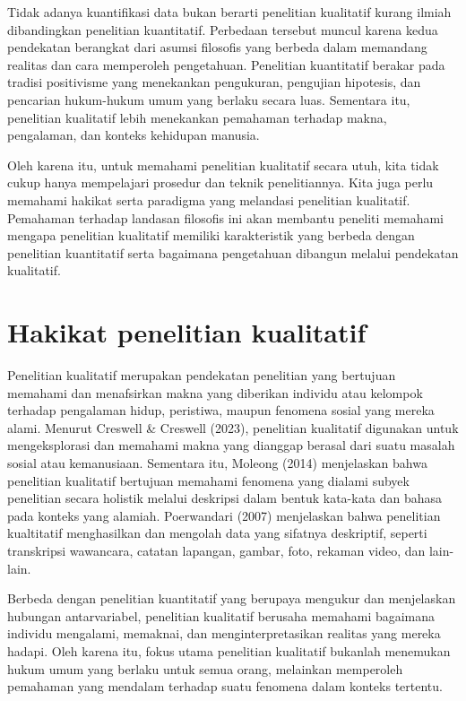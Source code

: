 \documentclass[
  indonesian,
  letterpaper,
  DIV=11,
  numbers=noendperiod]{scrreprt}
\begin{document}
Tidak adanya kuantifikasi data bukan berarti penelitian kualitatif
kurang ilmiah dibandingkan penelitian kuantitatif. Perbedaan tersebut
muncul karena kedua pendekatan berangkat dari asumsi filosofis yang
berbeda dalam memandang realitas dan cara memperoleh pengetahuan.
Penelitian kuantitatif berakar pada tradisi positivisme yang menekankan
pengukuran, pengujian hipotesis, dan pencarian hukum-hukum umum yang
berlaku secara luas. Sementara itu, penelitian kualitatif lebih
menekankan pemahaman terhadap makna, pengalaman, dan konteks kehidupan
manusia.

Oleh karena itu, untuk memahami penelitian kualitatif secara utuh, kita
tidak cukup hanya mempelajari prosedur dan teknik penelitiannya. Kita
juga perlu memahami hakikat serta paradigma yang melandasi penelitian
kualitatif. Pemahaman terhadap landasan filosofis ini akan membantu
peneliti memahami mengapa penelitian kualitatif memiliki karakteristik
yang berbeda dengan penelitian kuantitatif serta bagaimana pengetahuan
dibangun melalui pendekatan kualitatif.

\section{Hakikat penelitian
kualitatif}\label{hakikat-penelitian-kualitatif}

Penelitian kualitatif merupakan pendekatan penelitian yang bertujuan
memahami dan menafsirkan makna yang diberikan individu atau kelompok
terhadap pengalaman hidup, peristiwa, maupun fenomena sosial yang mereka
alami. Menurut Creswell \& Creswell (2023), penelitian kualitatif
digunakan untuk mengeksplorasi dan memahami makna yang dianggap berasal
dari suatu masalah sosial atau kemanusiaan. Sementara itu, Moleong
(2014) menjelaskan bahwa penelitian kualitatif bertujuan memahami
fenomena yang dialami subyek penelitian secara holistik melalui
deskripsi dalam bentuk kata-kata dan bahasa pada konteks yang alamiah.
Poerwandari (2007) menjelaskan bahwa penelitian kualtitatif menghasilkan
dan mengolah data yang sifatnya deskriptif, seperti transkripsi
wawancara, catatan lapangan, gambar, foto, rekaman video, dan lain-lain.

Berbeda dengan penelitian kuantitatif yang berupaya mengukur dan
menjelaskan hubungan antarvariabel, penelitian kualitatif berusaha
memahami bagaimana individu mengalami, memaknai, dan menginterpretasikan
realitas yang mereka hadapi. Oleh karena itu, fokus utama penelitian
kualitatif bukanlah menemukan hukum umum yang berlaku untuk semua orang,
melainkan memperoleh pemahaman yang mendalam terhadap suatu fenomena
dalam konteks tertentu.
\end{document}
